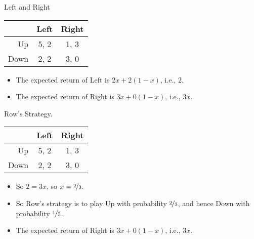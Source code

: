 \documentclass[
  ignorenonframetext,
]{beamer}
\providecommand{\tightlist}{%
  \setlength{\itemsep}{0pt}\setlength{\parskip}{0pt}}
\begin{document}
\begin{frame}{Left and Right}
\protect\hypertarget{left-and-right}{}
\begin{table}[!h]
\centering
\begin{tabular}[t]{>{}r|cc}
\toprule
 & Left & Right\\
\midrule
Up & 5, 2 & 1, 3\\
Down & 2, 2 & 3, 0\\
\bottomrule
\end{tabular}
\end{table}

\begin{itemize}
\tightlist
\item
  The expected return of Left is \(2x + 2(1-x)\), i.e., \(2\).
\item
  The expected return of Right is \(3x + 0(1-x)\), i.e., \(3x\).
\end{itemize}
\end{frame}

\begin{frame}{Row's Strategy.}
\protect\hypertarget{rows-strategy.}{}
\begin{table}[!h]
\centering
\begin{tabular}[t]{>{}r|cc}
\toprule
 & Left & Right\\
\midrule
Up & 5, 2 & 1, 3\\
Down & 2, 2 & 3, 0\\
\bottomrule
\end{tabular}
\end{table}

\begin{itemize}
\tightlist
\item
  So \(2 = 3x\), so \(x = \nicefrac{2}{3}\).
\item
  So Row's strategy is to play Up with probability \(\nicefrac{2}{3}\),
  and hence Down with probability \(\nicefrac{1}{3}\).
\end{itemize}
\end{frame}

\begin{frame}{}
\protect\hypertarget{section}{}
\begin{itemize}
\tightlist
\item
  The expected return of Right is \(3x + 0(1-x)\), i.e., \(3x\).
\end{itemize}
\end{frame}
\end{document}
